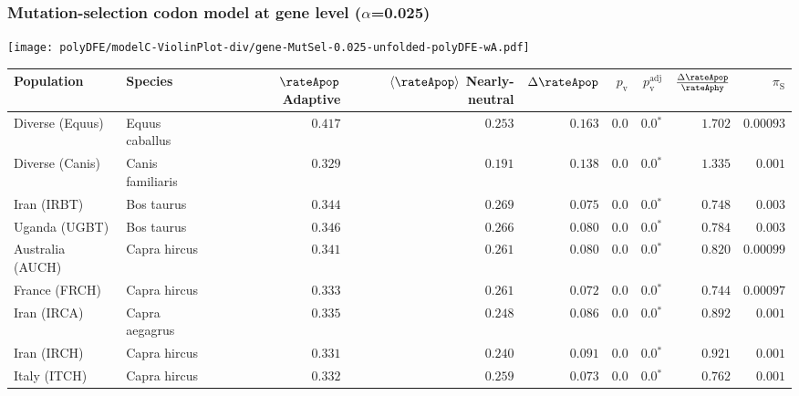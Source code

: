 \subsubsection*{Mutation-selection codon model at gene level ($\alpha$=0.025)}
\begin{center}
    \texttt{[image: polyDFE/modelC-ViolinPlot-div/gene-MutSel-0.025-unfolded-polyDFE-wA.pdf]}
    \begin{adjustbox}{width = 1\textwidth}
        \begin{tabular}{|l|l|r|r|r|r|r|r|r|}
            \toprule
            Population & Species & \specialcell{$\rateApop$ \\ Adaptive}                & \specialcell{$\left< \rateApop \right>$ \\ Nearly-neutral}                & $\Delta \rateApop $    & $p_{\mathrm{v}}$ & $p_{\mathrm{v}}^{\mathrm{adj}}$ & $\frac{\Delta\rateApop}{\rateAphy}$ & $\pi_{\textrm{S}}$ \\
            \midrule
            Diverse (Equus)                    & Equus caballus          & $ 0.417$ & $ 0.253$ & $ 0.163$ & $0.0$ & $\bm{0.0{^*}}$ & $ 1.702$ & $0.00093$  \\
            Diverse (Canis)                  & Canis familiaris          & $ 0.329$ & $ 0.191$ & $ 0.138$ & $0.0$ & $\bm{0.0{^*}}$ & $ 1.335$ & $ 0.001$ \\
            Iran (IRBT)               & Bos taurus        & $ 0.344$ & $ 0.269$ & $ 0.075$ & $0.0$ & $\bm{0.0{^*}}$ & $ 0.748$ & $ 0.003$ \\
            Uganda (UGBT)                  & Bos taurus        & $ 0.346$ & $ 0.266$ & $ 0.080$ & $0.0$ & $\bm{0.0{^*}}$ & $ 0.784$ & $ 0.003$ \\
            Australia (AUCH)                    & Capra hircus      & $ 0.341$ & $ 0.261$ & $ 0.080$ & $0.0$ & $\bm{0.0{^*}}$ & $ 0.820$ & $0.00099$ \\
            France (FRCH)                    & Capra hircus        & $ 0.333$ & $ 0.261$ & $ 0.072$ & $0.0$ & $\bm{0.0{^*}}$ & $ 0.744$ & $0.00097$ \\
            Iran (IRCA)                   & Capra aegagrus        & $ 0.335$ & $ 0.248$ & $ 0.086$ & $0.0$ & $\bm{0.0{^*}}$ & $ 0.892$ & $ 0.001$ \\
            Iran (IRCH)                 & Capra hircus        & $ 0.331$ & $ 0.240$ & $ 0.091$ & $0.0$ & $\bm{0.0{^*}}$ & $ 0.921$ & $ 0.001$ \\
            Italy (ITCH)                    & Capra hircus          & $ 0.332$ & $ 0.259$ & $ 0.073$ & $0.0$ & $\bm{0.0{^*}}$ & $ 0.762$ & $ 0.001$  \\

\end{tabular}
\end{adjustbox}
\end{center}
